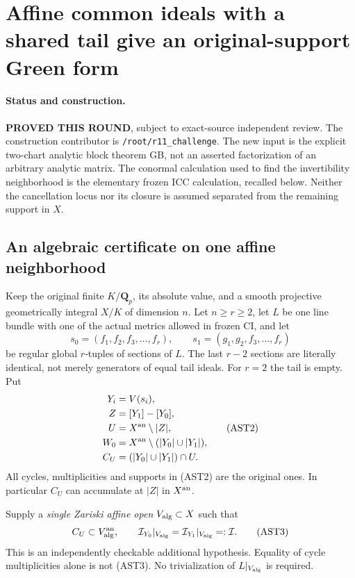 \section{Affine common ideals with a shared tail give an original-support Green form}
\label{sec:r11-affine-shared-tail}

\paragraph{Status and construction.}
\textbf{PROVED THIS ROUND}, subject to exact-source independent review.
The construction contributor is \texttt{/root/r11\_challenge}.
The new input is the explicit two-chart analytic block theorem GB,
not an asserted factorization of an arbitrary analytic matrix.
The conormal calculation used to find the invertibility neighborhood
is the elementary frozen ICC calculation, recalled below.
Neither the cancellation locus nor its closure is assumed separated
from the remaining support in $X$.

\subsection{An algebraic certificate on one affine neighborhood}

Keep the original finite $K/\mathbf Q_p$, its absolute value, and a
smooth projective geometrically integral $X/K$ of dimension $n$.
Let $n\ge r\ge2$, let $L$ be one line bundle with one of the actual
metrics allowed in frozen CI, and let
\[
 s_0=(f_1,f_2,f_3,\ldots,f_r),\qquad
 s_1=(g_1,g_2,f_3,\ldots,f_r)
 \tag{AST1}
\]
be regular global $r$-tuples of sections of $L$.  The last $r-2$
sections are literally identical, not merely generators of equal
tail ideals.  For $r=2$ the tail is empty.  Put
\[
 \begin{split}
 Y_i&=V(s_i),\\
 Z&=[Y_1]-[Y_0],\\
 U&=X^{\rm an}\setminus|Z|,\\
 W_0&=X^{\rm an}\setminus(|Y_0|\cup|Y_1|),\\
 C_U&=(|Y_0|\cup|Y_1|)\cap U.
 \end{split}
 \tag{AST2}
\]
All cycles, multiplicities and supports in (AST2) are the original
ones.  In particular $C_U$ can accumulate at $|Z|$ in $X^{\rm an}$.

Supply a \emph{single Zariski affine open} $V_{\rm alg}\subset X$
such that
\[
 C_U\subset V_{\rm alg}^{\rm an},\qquad
 \mathcal I_{Y_0}|_{V_{\rm alg}}
       =\mathcal I_{Y_1}|_{V_{\rm alg}}=:\mathcal I.
 \tag{AST3}
\]
This is an independently checkable additional hypothesis.  Equality
of cycle multiplicities alone is not (AST3).  No trivialization of
$L|_{V_{\rm alg}}$ is required.

